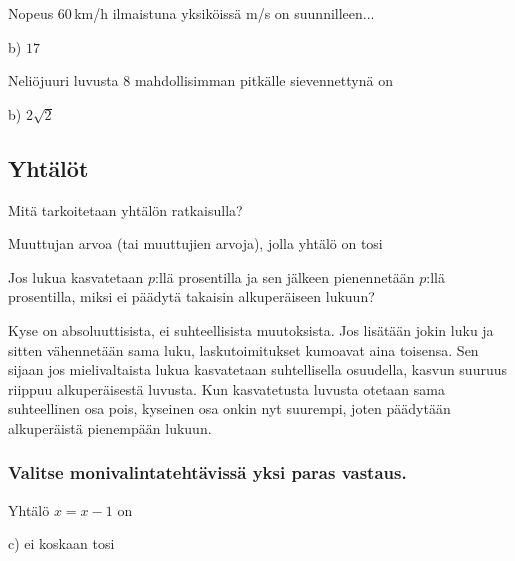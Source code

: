 \begin{tehtava}
Nopeus $60$\,km/h ilmaistuna yksiköissä m/s on suunnilleen...
	\begin{vastaus}
	b) $17$
	\end{vastaus}
\end{tehtava}

\begin{tehtava}
Neliöjuuri luvusta $8$ mahdollisimman pitkälle sievennettynä on

  \begin{vastaus}
	 b) $2\sqrt{2}$
    \end{vastaus}
\end{tehtava}

\subsection*{Yhtälöt}

\begin{tehtava}
Mitä tarkoitetaan yhtälön ratkaisulla?
\begin{vastaus}
Muuttujan arvoa (tai muuttujien arvoja), jolla yhtälö on tosi
\end{vastaus}
\end{tehtava}

\begin{tehtava}
Jos lukua kasvatetaan $p$:llä prosentilla ja sen jälkeen pienennetään $p$:llä prosentilla, miksi ei päädytä takaisin alkuperäiseen lukuun?
	\begin{vastaus}
	Kyse on absoluuttisista, ei suhteellisista muutoksista. Jos lisätään jokin luku ja sitten vähennetään sama luku, laskutoimitukset kumoavat aina toisensa. Sen sijaan jos mielivaltaista lukua kasvatetaan suhtellisella osuudella, kasvun suuruus riippuu alkuperäisestä luvusta. Kun kasvatetusta luvusta otetaan sama suhteellinen osa pois, kyseinen osa onkin nyt suurempi, joten päädytään alkuperäistä pienempään lukuun.
	\end{vastaus}
\end{tehtava}

\subsubsection*{Valitse monivalintatehtävissä yksi paras vastaus.}

\begin{tehtava}
Yhtälö $x = x-1$ on
\begin{vastaus}
c) ei koskaan tosi
\end{vastaus}
\end{tehtava}

